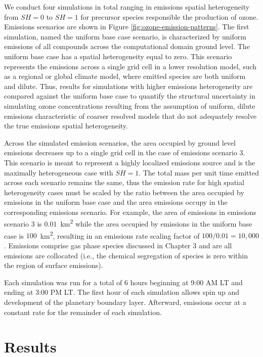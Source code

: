 We conduct four simulations in total ranging in emissions spatial heterogeneity from $SH=0$ to $SH=1$ for precursor species responsible the production of ozone. Emissions scenarios are shown in Figure \ref{fig:ozone-emission-patterns}. The first simulation, named the uniform base case scenario, is characterized by uniform emissions of all compounds across the computational domain ground level. The uniform base case has a spatial heterogeneity equal to zero. This scenario represents the emissions across a single grid cell in a lower resolution model, such as a regional or global climate model, where emitted species are both uniform and dilute. Thus, results for simulations with higher emissions heterogeneity are compared against the uniform base case to quantify the structural uncertainty in simulating ozone concentrations resulting from the assumption of uniform, dilute emissions characteristic of coarser resolved models that do not adequately resolve the true emissions spatial heterogeneity.  

Across the simulated emission scenarios, the area occupied by ground level emissions decreases up to a single grid cell in the case of emissions scenario 3. This scenario is meant to represent a highly localized emissions source and is the maximally heterogeneous case with $SH=1$. The total mass per unit time emitted across each scenario remains the same, thus the emission rate for high spatial heterogeneity cases must be scaled by the ratio between the area occupied by emissions in the uniform base case and the area emissions occupy in the corresponding emissions scenario. For example, the area of emissions in emissions scenario 3 is $0.01$~\si{km^2} while the area occupied by emissions in the uniform base case is  $100$~\si{km^2}, resulting in an emissions rate scaling factor of $100/0.01 = 10,000$. Emissions comprise gas phase species discussed in Chapter 3 and are all emissions are collocated (i.e., the chemical segregation of species is zero within the region of surface emissions). 

Each simulation was run for a total of 6 hours beginning at 9:00 AM LT and ending at 3:00 PM LT. The first hour of each simulation allows spin up and development of the planetary boundary layer. Afterward, emissions occur at a constant rate for the remainder of each simulation.

\section{Results}

